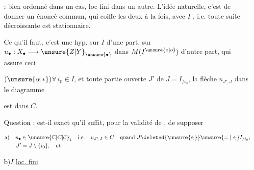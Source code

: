 
 : bien ordonné dans un cas, loc fini dans un autre. L'idée naturelle, c'est de  donner un énoncé commun, qui coiffe les deux à la fois, avec $I$ , i.e. toute suite décroissante est stationnaire.

Ce qu'il faut, c'est une hyp. sur $I$ d'une part, sur $u_\bullet:X_\bullet\longrightarrow \unsure{Z|Y}_{\unsure{\bullet}}$ dans $M(I^{\unsure{\circ|o}})$ d'autre part, qui assure ceci

$(\unsure{\alpha|*})$\qquad $\forall\,i_0\in I$, et toute partie ouverte $J'$ de $J=I_{/i_0}$, la flèche $u_{J',J}$ dans le diagramme


est dans $C$.

Question : est-il exact qu'il suffit, pour la validité de \unsure{$\alpha$}, de supposer

\[
\begin{aligned}
&\text{a)}\quad u_\bullet\in \unsure{\mathbb C|C|\mathcal C}_I \quad\text{i.e.}\quad u_{J',J}\in C
 \quad \text{quand } J\deleted{\unsure{\in}}\unsure{=|\in}I_{/i_0},\\
&\qquad J'=J\setminus\{i_0\},\quad\text{et}
\end{aligned}
\]

b)\quad $I$ \uline{loc. fini} 


